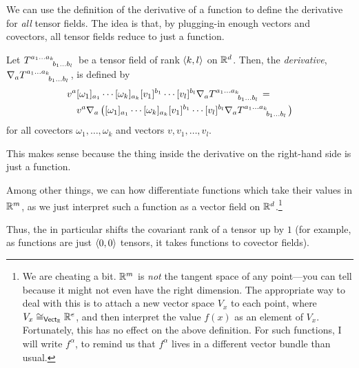 We can use the definition of the derivative of a function to define the derivative for \emph{all} tensor fields.  The idea is that, by plugging-in enough vectors and covectors, all tensor fields reduce to just a function.
\begin{dfn}\label{DerivativeTensor}
Let $T\indices{^{a_1\ldots a_k}_{b_1\ldots b_l}}$ be a tensor field of rank $\langle k,l\rangle$ on $\mathbb{R} ^d$.  Then, the \emph{derivative}, $\nabla _aT\indices{^{a_1\ldots a_k}_{b_1\ldots b_l}}$, is defined by
\begin{equation}
\begin{multlined}
v^a[\omega _1]_{a_1}\cdots [\omega _k]_{a_k}[v_1]^{b_1}\cdots [v_l]^{b_l}\nabla _aT\indices{^{a_1\ldots a_k}_{b_1\ldots b_l}}= \\ v^a\nabla _a\left( [\omega _1]_{a_1}\cdots [\omega _k]_{a_k}[v_1]^{b_1}\cdots [v_l]^{b_l}\nabla _aT\indices{^{a_1\ldots a_k}_{b_1\ldots b_l}}\right) 
\end{multlined}
\end{equation}
for all covectors $\omega _1,\ldots ,\omega _k$ and vectors $v,v_1,\ldots ,v_l$.
\begin{rmk}
This makes sense because the thing inside the derivative on the right-hand side is just a function.
\end{rmk}
\begin{rmk}
Among other things, we can how differentiate functions which take their values in $\mathbb{R} ^m$, as we just interpret such a function as a vector field on $\mathbb{R} ^d$.\footnote{We are cheating a bit.  $\mathbb{R} ^m$ is \emph{not} the tangent space of any point---you can tell because it might not even have the right dimension.  The appropriate way to deal with this is to attach a new vector space $V_x$ to each point, where $V_x\cong _{\mathsf{Vect} _{\mathbb{R}}}\mathbb{R} ^e$, and then interpret the value $f(x)$ as an element of $V_x$.  Fortunately, this has no effect on the above definition.  For such functions, I will write $f^\alpha$, to remind us that $f^\alpha$ lives in a different vector bundle than usual.}
\end{rmk}
\begin{rmk}
Thus, the  in particular shifts the covariant rank of a tensor up by $1$ (for example, as functions are just $\langle0,0\rangle$ tensors, it takes functions to covector fields).
\end{rmk}
\end{dfn}
